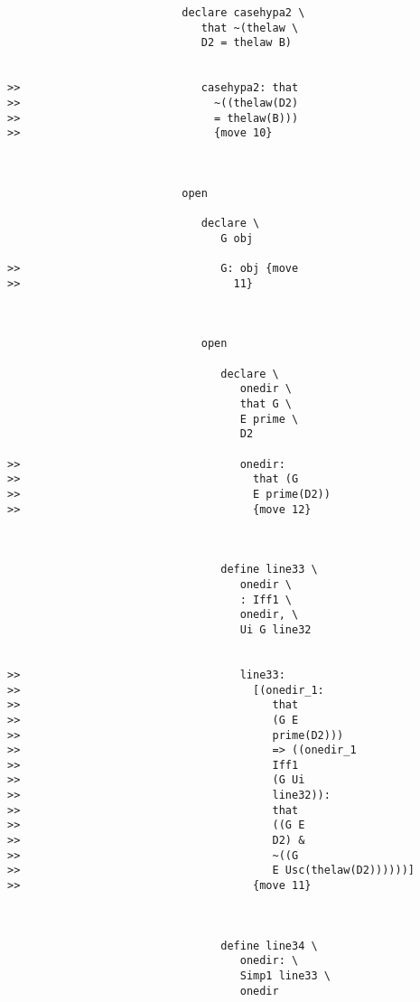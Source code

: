 \documentclass[12pt]{article}
\begin{document}
\begin{verbatim}
                           declare casehypa2 \
                              that ~(thelaw \
                              D2 = thelaw B)


>>                            casehypa2: that
>>                              ~((thelaw(D2)
>>                              = thelaw(B)))
>>                              {move 10}



                           open

                              declare \
                                 G obj

>>                               G: obj {move
>>                                 11}



                              open

                                 declare \
                                    onedir \
                                    that G \
                                    E prime \
                                    D2

>>                                  onedir:
>>                                    that (G
>>                                    E prime(D2))
>>                                    {move 12}



                                 define line33 \
                                    onedir \
                                    : Iff1 \
                                    onedir, \
                                    Ui G line32


>>                                  line33:
>>                                    [(onedir_1:
>>                                       that
>>                                       (G E
>>                                       prime(D2)))
>>                                       => ((onedir_1
>>                                       Iff1
>>                                       (G Ui
>>                                       line32)):
>>                                       that
>>                                       ((G E
>>                                       D2) &
>>                                       ~((G
>>                                       E Usc(thelaw(D2))))))]
>>                                    {move 11}



                                 define line34 \
                                    onedir: \
                                    Simp1 line33 \
                                    onedir



\end{verbatim}
\end{document}
